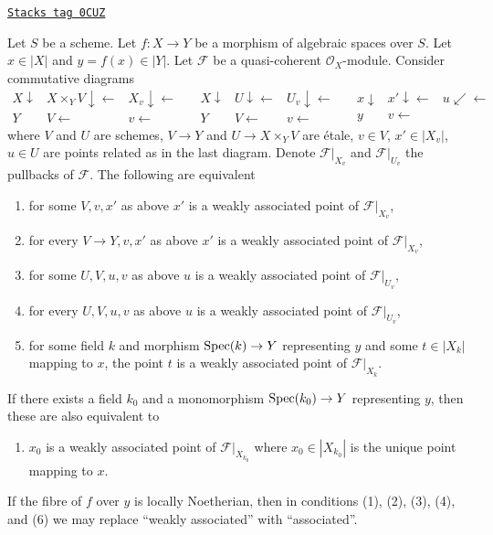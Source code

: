 \begin{lemma}
\label{spaces-divisors-lemma-relative-assassin}
\href{https://stacks.math.columbia.edu/tag/0CUZ}{\texttt{Stacks tag 0CUZ}}

Let $S$ be a scheme. Let $f : X \to Y$ be a morphism of algebraic spaces
over $S$. Let $x \in |X|$ and $y = f(x) \in |Y|$.
Let $\mathcal{F}$ be a quasi-coherent
$\mathcal{O}_X$-module. Consider commutative diagrams
$$
\begin{array}{ccc}X \downarrow & X \times_Y V \downarrow\longleftarrow & X_v \downarrow\longleftarrow \\ Y & V \longleftarrow & v \longleftarrow\end{array}
\quad
\begin{array}{ccc}X \downarrow & U \downarrow\longleftarrow & U_v \downarrow\longleftarrow \\ Y & V \longleftarrow & v \longleftarrow\end{array}
\quad
\begin{array}{ccc}x \downarrow & x' \downarrow\longleftarrow & u \swarrow\longleftarrow \\ y & v \longleftarrow & \end{array}
$$
where $V$ and $U$ are schemes, $V \to Y$ and $U \to X \times_Y V$
are \'etale, $v \in V$, $x' \in |X_v|$, $u \in U$ are points
related as in the last diagram.
Denote $\mathcal{F}|_{X_v}$ and $\mathcal{F}|_{U_v}$
the pullbacks of $\mathcal{F}$.
The following are equivalent
\begin{enumerate}
\item for some $V, v, x'$ as above $x'$ is a weakly associated
point of $\mathcal{F}|_{X_v}$,
\item for every $V \to Y, v, x'$ as above $x'$ is a weakly associated
point of $\mathcal{F}|_{X_v}$,
\item for some $U, V, u, v$ as above $u$ is a weakly associated
point of $\mathcal{F}|_{U_v}$,
\item for every $U, V, u, v$ as above $u$ is a weakly associated
point of $\mathcal{F}|_{U_v}$,
\item for some field $k$ and morphism $\operatorname{Spec}(k) \to Y$ representing $y$
and some $t \in |X_k|$ mapping to $x$, the point $t$ is a weakly
associated point of $\mathcal{F}|_{X_k}$.
\end{enumerate}
If there exists a field $k_0$ and a monomorphism $\operatorname{Spec}(k_0) \to Y$
representing $y$, then these are also equivalent to
\begin{enumerate}
\item[(6)] $x_0$ is a weakly associated point of $\mathcal{F}|_{X_{k_0}}$
where $x_0 \in |X_{k_0}|$ is the unique point mapping to $x$.
\end{enumerate}
If the fibre of $f$ over $y$ is locally Noetherian, then in
conditions (1), (2), (3), (4), and (6) we may replace
``weakly associated'' with ``associated''.
\end{lemma}


